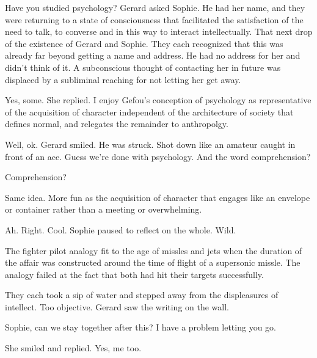 

Have you studied psychology?  Gerard asked Sophie.  He had her name,
and they were returning to a state of consciousness that facilitated
the satisfaction of the need to talk, to converse and in this way to
interact intellectually.  That next drop of the existence of Gerard
and Sophie.  They each recognized that this was already far beyond
getting a name and address.  He had no address for her and didn't
think of it.  A subconscious thought of contacting her in future was
displaced by a subliminal reaching for not letting her get away.  

Yes, some.  She replied.  I enjoy Gefou's conception of psychology as
representative of the acquisition of character independent of the
architecture of society that defines normal, and relegates the
remainder to anthropolgy.

Well, ok.  Gerard smiled.  He was struck.  Shot down like an amateur
caught in front of an ace.  Guess we're done with psychology.  And the
word comprehension?

Comprehension?

Same idea.  More fun as the acquisition of character that engages like
an envelope or container rather than a meeting or overwhelming.  

Ah.  Right.  Cool.  Sophie paused to reflect on the whole.  Wild.  

The fighter pilot analogy fit to the age of missles and jets when the
duration of the affair was constructed around the time of flight of a
supersonic missle.  The analogy failed at the fact that both had hit
their targets successfully.

They each took a sip of water and stepped away from the displeasures
of intellect.  Too objective.  Gerard saw the writing on the wall.

Sophie, can we stay together after this?  I have a problem letting you
go.

She smiled and replied.  Yes, me too.

\bye
